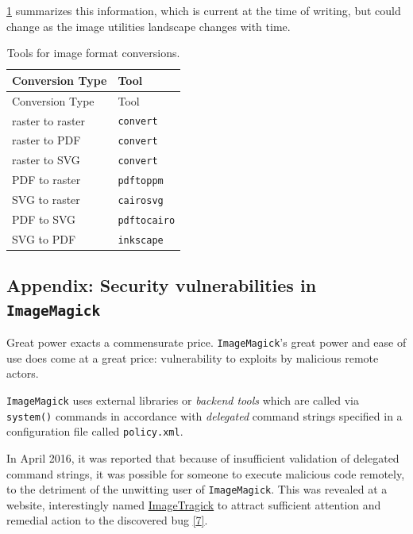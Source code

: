\documentclass[
  12pt,
  british,
  a4paper,
  rgb,
  dvipsnames,
  svgnames,
  hyphens]{article}
\begin{document}
\cref{tbl:formats} summarizes this information, which is current at the
time of writing, but could change as the image utilities landscape
changes with time.

\hypertarget{tbl:formats}{}
\begin{longtable}[]{@{}ll@{}}
\caption{\label{tbl:formats}Tools for image format
conversions.}\tabularnewline
\toprule
Conversion Type & Tool \\
\midrule
\endfirsthead
\toprule
Conversion Type & Tool \\
\midrule
\endhead
raster to raster & \texttt{convert} \\
raster to PDF & \texttt{convert} \\
raster to SVG & \texttt{convert} \\
PDF to raster & \texttt{pdftoppm} \\
SVG to raster & \texttt{cairosvg} \\
PDF to SVG & \texttt{pdftocairo} \\
SVG to PDF & \texttt{inkscape} \\
\bottomrule
\end{longtable}

\hypertarget{appendix-security-vulnerabilities-in-imagemagick}{%
\subsection{\texorpdfstring{Appendix: Security vulnerabilities in
\texttt{ImageMagick}}{Appendix: Security vulnerabilities in ImageMagick}}\label{appendix-security-vulnerabilities-in-imagemagick}}

Great power exacts a commensurate price. \texttt{ImageMagick}'s great
power and ease of use does come at a great price: vulnerability to
exploits by malicious remote actors.

\texttt{ImageMagick} uses external libraries or \emph{backend tools}
which are called via \texttt{system()} commands in accordance with
\emph{delegated} command strings specified in a configuration file
called \texttt{policy.xml}.

In April 2016, it was reported that because of insufficient validation
of delegated command strings, it was possible for someone to execute
malicious code remotely, to the detriment of the unwitting user of
\texttt{ImageMagick}. This was revealed at a website, interestingly
named \href{https://imagetragick.com/}{ImageTragick} to attract
sufficient attention and remedial action to the discovered bug
\protect\hyperlink{ref-imagetragick2016}{{[}7{]}}.
\end{document}
